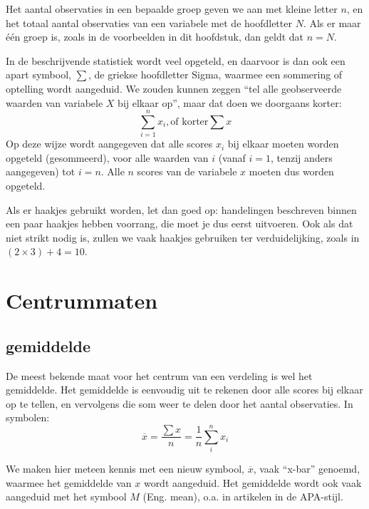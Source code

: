 \documentclass[
]{book}
\begin{document}
Het aantal observaties in een bepaalde groep geven we aan met kleine
letter \(n\), en het totaal aantal observaties van een variabele met de
hoofdletter \(N\). Als er maar één groep is, zoals in de voorbeelden in
dit hoofdstuk, dan geldt dat \(n=N\).

In de beschrijvende statistiek wordt veel opgeteld, en daarvoor is dan
ook een apart symbool, \(\sum\), de griekse hoofdletter Sigma, waarmee een
sommering of optelling wordt aangeduid. We zouden kunnen zeggen ``tel
alle geobserveerde waarden van variabele \(X\) bij elkaar op'', maar dat
doen we doorgaans korter:
\[\sum\limits_{i=1}^n x_i, \textrm{of korter} \sum x
\]
Op deze wijze
wordt aangegeven dat alle scores \(x_i\) bij elkaar moeten worden opgeteld
(gesommeerd), voor alle waarden van \(i\) (vanaf \(i=1\), tenzij anders
aangegeven) tot \(i=n\). Alle \(n\) scores van de variabele \(x\) moeten dus
worden opgeteld.

Als er haakjes gebruikt worden, let dan goed op: handelingen beschreven
binnen een paar haakjes hebben voorrang, die moet je dus eerst
uitvoeren. Ook als dat niet strikt nodig is, zullen we vaak haakjes
gebruiken ter verduidelijking, zoals in \((2\times3)+4=10\).

\hypertarget{centrummaten}{%
\section{Centrummaten}\label{centrummaten}}

\hypertarget{sec:gemiddelde}{%
\subsection{gemiddelde}\label{sec:gemiddelde}}

De meest bekende maat voor het centrum van een verdeling is wel het
gemiddelde. Het gemiddelde is eenvoudig uit te rekenen door alle scores
bij elkaar op te tellen, en vervolgens die som weer te delen door het
aantal observaties. In symbolen:
\begin{equation} 
  \overline{x} = \frac{\sum x}{n} = \frac{1}{n} \sum\limits_{i}^n x_i
  \label{eq:gemiddelde}
\end{equation}

We maken hier meteen kennis met een nieuw symbool, \(\overline{x}\), vaak
``x-bar'' genoemd, waarmee het gemiddelde van \(x\) wordt aangeduid. Het gemiddelde
wordt ook vaak aangeduid met het symbool \(M\) (Eng. mean), o.a. in
artikelen in de APA-stijl.
\end{document}
